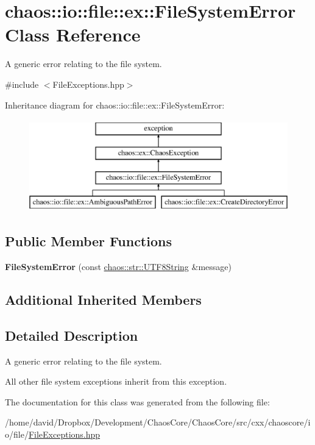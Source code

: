 \hypertarget{classchaos_1_1io_1_1file_1_1ex_1_1_file_system_error}{\section{chaos\-:\-:io\-:\-:file\-:\-:ex\-:\-:File\-System\-Error Class Reference}
\label{classchaos_1_1io_1_1file_1_1ex_1_1_file_system_error}
}


A generic error relating to the file system.  




{\ttfamily \#include $<$File\-Exceptions.\-hpp$>$}

Inheritance diagram for chaos\-:\-:io\-:\-:file\-:\-:ex\-:\-:File\-System\-Error\-:\begin{figure}[H]
\begin{center}
\leavevmode
\includegraphics[height=4.000000cm]{classchaos_1_1io_1_1file_1_1ex_1_1_file_system_error}
\end{center}
\end{figure}
\subsection*{Public Member Functions}
\begin{DoxyCompactItemize}
\item 
\hypertarget{classchaos_1_1io_1_1file_1_1ex_1_1_file_system_error_a3a7ccd38be7d46a8e1414ce8ab38506e}{{\bfseries File\-System\-Error} (const \hyperlink{classchaos_1_1str_1_1_u_t_f8_string}{chaos\-::str\-::\-U\-T\-F8\-String} \&message)}\label{classchaos_1_1io_1_1file_1_1ex_1_1_file_system_error_a3a7ccd38be7d46a8e1414ce8ab38506e}

\end{DoxyCompactItemize}
\subsection*{Additional Inherited Members}


\subsection{Detailed Description}
A generic error relating to the file system. 

All other file system exceptions inherit from this exception. 

The documentation for this class was generated from the following file\-:\begin{DoxyCompactItemize}
\item 
/home/david/\-Dropbox/\-Development/\-Chaos\-Core/\-Chaos\-Core/src/cxx/chaoscore/io/file/\hyperlink{_file_exceptions_8hpp}{File\-Exceptions.\-hpp}\end{DoxyCompactItemize}
